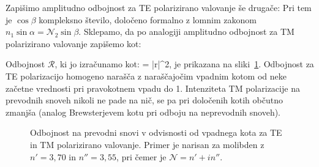 Zapišimo amplitudno odbojnost za TE polarizirano valovanje še drugače:
Pri tem je $\cos \beta$ kompleksno število, določeno formalno 
z lomnim zakonom $n_1 \sin \alpha = \mathcal{N}_2 \sin \beta$.
Sklepamo, da po analogiji amplitudno odbojnost za TM polarizirano valovanje zapišemo kot: 


Odbojnost $\mathcal{R}$, ki jo izračunamo kot:
\beq
{} = |r|^2,
\label{eq:04_100a}
\eeq
je prikazana na sliki~\ref{fig:04_kovina}. Odbojnost za TE polarizacijo
homogeno narašča z naraščajočim vpadnim kotom 
od neke začetne vrednosti pri pravokotnem vpadu do 1. 
Intenziteta TM polarizacije na prevodnih snoveh 
nikoli ne pade na nič, se pa pri določenih kotih občutno
zmanjša (analog Brewsterjevem kotu pri odboju na neprevodnih snoveh).
\begin{figure}[ht]
\centering
\def\svgwidth{70truemm} 

\caption{Odbojnost na prevodni snovi v odvisnosti od vpadnega kota za TE in TM polarizirano
valovanje. Primer je narisan za molibden z $n'=3,70$ in $n''=3,55$, pri čemer je $\mathcal{N} = n'+in''$.}
\label{fig:04_kovina}
\end{figure}


